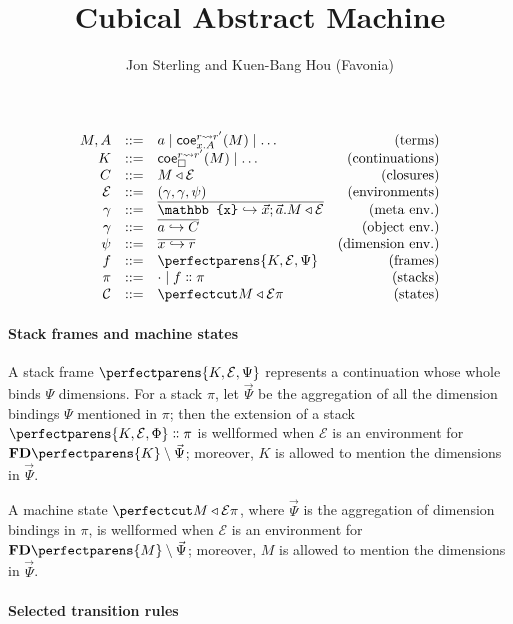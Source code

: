 \documentclass{article}
\title{Cubical Abstract Machine}
\author{Jon Sterling and Kuen-Bang Hou (Favonia)}
\newcommand\Clo[2]{#1\triangleleft{#2}}
\newcommand\Coe[4]{\mathsf{coe}^{#1\leadsto{#2}}_{#3} (#4)}
\newcommand\Cons[2]{{#1}\dblcolon{#2}}
\newcommand\FreeDims[1]{\mathbf{FD}\perfectparens{#1}}
\newcommand\Frame[3]{\perfectparens{#1,#2,#3}}
\newcommand\Cfg[3]{\cut{\Clo{#1}{#2}}{#3}}
\newcommand\Meta[1]{\mathbb{#1}}
\begin{document}
\maketitle

\[
  \begin{array}{rrlr}
    M,A &::= &a\mid \Coe{r}{r'}{x.A}{M}\mid\ldots&\text{(terms)}\\
    K &::= &\Coe{r}{r'}{\Box}{M}\mid\ldots&\text{(continuations)}\\
    C &::= &\Clo{M}{\mathcal{E}}&\text{(closures)}\\
    \mathcal{E} &::= &(\Meta{\gamma},\gamma,\psi)&\text{(environments)}\\
    \Meta{\gamma} &::= &\overline{\Meta{x}\hookrightarrow \vec{x};\vec{a}.\Clo{M}{\mathcal{E}}}&\text{(meta env.)}\\
    \gamma &::= &\overline{a\hookrightarrow C}&\text{(object env.)}\\
    \psi &::= &\overline{x\hookrightarrow r}&\text{(dimension env.)}\\
    f &::= &\Frame{K}{\mathcal{E}}{\Psi} &\text{(frames)}\\
    \pi &::= &\cdot \mid \Cons{f}{\pi} &\text{(stacks)}\\
    \mathcal{C} &::= &\Cfg{M}{\mathcal{E}}{\pi} &\text{(states)}
  \end{array}
\]

\paragraph{Stack frames and machine states}

A stack frame $\Frame{K}{\mathcal{E}}{\Psi}$ represents a continuation
whose whole binds $\Psi$ dimensions. For a stack $\pi$, let
$\vec{\Psi}$ be the aggregation of all the dimension bindings $\Psi$
mentioned in $\pi$; then the extension of a stack
$\Cons{\Frame{K}{\mathcal{E}}{\Phi}}{\pi}$ is wellformed when
$\mathcal{E}$ is an environment for $\FreeDims{K}\setminus\vec{\Psi}$;
moreover, $K$ is allowed to mention the dimensions in $\vec{\Psi}$.

A machine state $\Cfg{M}{\mathcal{E}}{\pi}$, where $\vec{\Psi}$ is the
aggregation of dimension bindings in $\pi$, is wellformed when
$\mathcal{E}$ is an environment for $\FreeDims{M}\setminus\vec{\Psi}$;
moreover, $M$ is allowed to mention the dimensions in $\vec{\Psi}$.

\paragraph{Selected transition rules}
\end{document}
